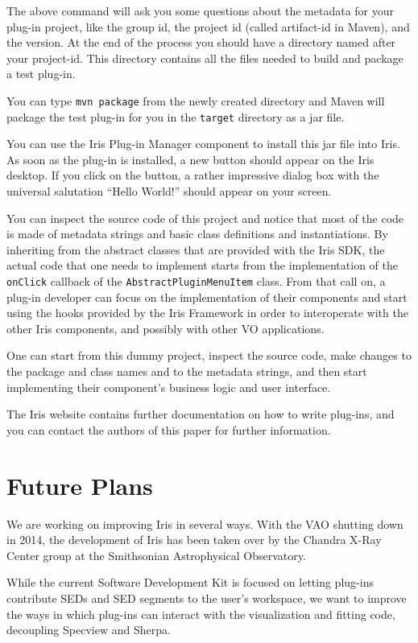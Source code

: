 \documentclass[final,5p,authoryear]{elsarticle}
\begin{document}
The above command will ask you some questions about the metadata for your
plug-in project, like the group id, the project id (called artifact-id in
Maven), and the version. At the end of the process you should have a directory
named after your project-id. This directory contains all the files needed to
build and package a test plug-in.

You can type \verb|mvn package| from the newly created directory and Maven will
package the test plug-in for you in the \verb|target| directory as a jar file.

You can use the Iris Plug-in Manager component to install this jar file into
Iris. As soon as the plug-in is installed, a new button should appear on the Iris desktop. If
you click on the button, a rather impressive dialog box with the universal salutation
``Hello World!'' should appear on your screen.

You can inspect the source code of this project and notice that most of the code is
made of metadata strings and basic class definitions and instantiations. By
inheriting from the abstract classes that are provided with the Iris SDK, the
actual code that one needs to implement starts from the implementation of the
\verb|onClick| callback of the \verb|AbstractPluginMenuItem| class. From that call on,
a plug-in developer can focus on the implementation of their components and
start using the hooks provided by the Iris Framework in order to interoperate
with the other Iris components, and possibly with other VO applications.

One can start from this dummy project, inspect the source code, make changes to
the package and class names and to the metadata strings, and then start
implementing their component's business logic and user interface.

The Iris website contains further documentation on how to write plug-ins, and
you can contact the authors of this paper for further information.

\section{Future Plans} We are working on improving Iris in several ways. With
the VAO shutting down in 2014, the development of Iris has been taken over by
the Chandra X-Ray Center group at the Smithsonian Astrophysical Observatory.

While the current Software Development Kit is focused on letting plug-ins
contribute SEDs and SED segments to the user's workspace, we want to improve the
ways in which plug-ins can interact with the visualization and fitting code,
decoupling Specview and Sherpa.
\end{document}
